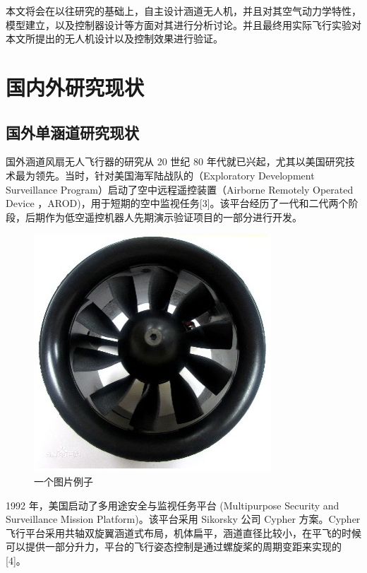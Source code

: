 \begin{ubox}
本文将会在以往研究的基础上，自主设计涵道无人机，并且对其空气动力学特性，模型建立，以及控制器设计等方面对其进行分析讨论。并且最终用实际飞行实验对本文所提出的无人机设计以及控制效果进行验证。

\section{国内外研究现状}
\subsection{国外单涵道研究现状}
国外涵道风扇无人飞行器的研究从 20 世纪 80 年代就已兴起，尤其以美国研究技术最为领先。当时，针对美国海军陆战队的（Exploratory  Development  Surveillance Program）启动了空中远程遥控装置（Airborne  Remotely  Operated  Device  ，AROD)，用于短期的空中监视任务[3]。该平台经历了一代和二代两个阶段，后期作为低空遥控机器人先期演示验证项目的一部分进行开发。
\begin{figure}[H]
	\centering
	\includegraphics[width=0.4\linewidth]{p1.jpg}
	\caption{一个图片例子}
	\label{fig:main}
\end{figure}
1992 年，美国启动了多用途安全与监视任务平台 (Multipurpose  Security  and Surveillance Mission Platform)。该平台采用 Sikorsky 公司 Cypher 方案。Cypher 飞行平台采用共轴双旋翼涵道式布局，机体扁平，涵道直径比较小，在平飞的时候可以提供一部分升力，平台的飞行姿态控制是通过螺旋桨的周期变距来实现的[4]。


\end{ubox}

